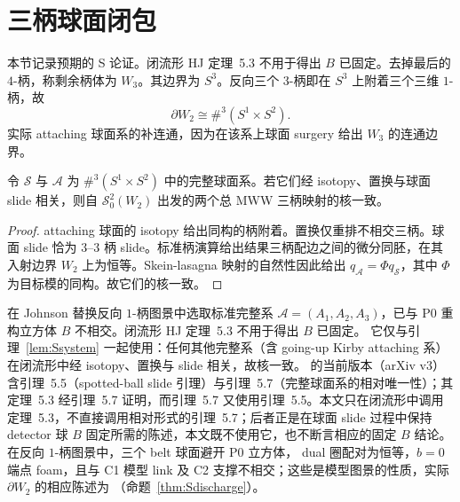 \section{三柄球面闭包}\label{sec:s-closure}

本节记录预期的 S 论证。闭流形 HJ 定理~5.3 不用于得出 $B$ 已固定。去掉最后的 $4$-柄，称剩余柄体为 $W_3$。其边界为 $S^3$。反向三个 $3$-柄即在 $S^3$ 上附着三个三维 $1$-柄，故
\[
\partial W_2\cong\#^3(S^1\times S^2).
\]
实际 attaching 球面系的补连通，因为在该系上球面 surgery 给出 $W_3$ 的连通边界。

\begin{lemma}[更换完整球面系下的核不变性]
\label{lem:Ssystem}
令 \(\mathcal S\) 与 \(\mathcal A\) 为 \(\#^3(S^1\times S^2)\) 中的完整球面系。若它们经 isotopy、置换与球面 slide 相关，则自 \(\mathcal S^2_0(W_2)\) 出发的两个总 MWW 三柄映射的核一致。
\end{lemma}

\begin{proof}
attaching 球面的 isotopy 给出同构的柄附着。置换仅重排不相交三柄。球面 slide 恰为 \(3\)--\(3\) 柄 slide。标准柄演算给出结果三柄配边之间的微分同胚，在其入射边界 $W_2$ 上为恒等。Skein-lasagna 映射的自然性因此给出 \(q_{\mathcal A}=\Phi q_{\mathcal S}\)，其中 \(\Phi\) 为目标模的同构。故它们的核一致。
\end{proof}

在 Johnson 替换反向 $1$-柄图景中选取标准完整系
\(\mathcal A=(A_1,A_2,A_3)\)，已与 P0 重构立方体 $B$ 不相交。闭流形 HJ 定理~5.3 不用于得出 $B$ 已固定。
它仅与引理~\ref{lem:Ssystem} 一起使用：任何其他完整系（含 going-up Kirby attaching 系）在闭流形中经 isotopy、置换与 slide 相关，故核一致。\cite{HorvatJablonowski2025} 的当前版本（arXiv v3）含引理~5.5（spotted-ball slide 引理）与引理~5.7（完整球面系的相对唯一性）；其定理~5.3 经引理~5.7 证明，而引理~5.7 又使用引理~5.5。本文只在闭流形中调用定理~5.3，不直接调用相对形式的引理~5.7；后者正是在球面 slide 过程中保持 detector 球 $B$ 固定所需的陈述，本文既不使用它，也不断言相应的固定 $B$ 结论。
在反向 $1$-柄图景中，三个 belt 球面避开 P0 立方体，
dual 圈配对为恒等，$b=0$ 端点 foam，且与 C1 模型 link 及 C2 支撑不相交；这些是模型图景的性质，实际 $\partial W_2$ 的相应陈述为 \Open（命题~\ref{thm:Sdischarge}）。

